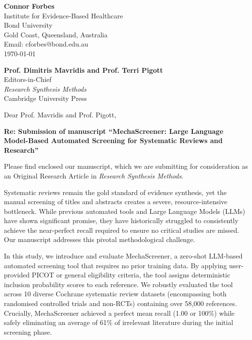 \documentclass[11pt,a4paper]{article}
\begin{document}
\begin{flushright}
\textbf{Connor Forbes}\\
Institute for Evidence-Based Healthcare\\
Bond University\\
Gold Coast, Queensland, Australia\\
Email: cforbes@bond.edu.au\\
\today
\end{flushright}

\vspace{2em}

\begin{flushleft}
\textbf{Prof. Dimitris Mavridis and Prof. Terri Pigott}\\
Editors-in-Chief\\
\textit{Research Synthesis Methods}\\
Cambridge University Press
\end{flushleft}

\vspace{2em}

Dear Prof. Mavridis and Prof. Pigott,

\vspace{1em}

\textbf{Re: Submission of manuscript ``MechaScreener: Large Language Model-Based Automated Screening for Systematic Reviews and Research''}

\vspace{1em}

Please find enclosed our manuscript, which we are submitting for consideration as an Original Research Article in \textit{Research Synthesis Methods}.

Systematic reviews remain the gold standard of evidence synthesis, yet the manual screening of titles and abstracts creates a severe, resource-intensive bottleneck. While previous automated tools and Large Language Models (LLMs) have shown significant promise, they have historically struggled to consistently achieve the near-perfect recall required to ensure no critical studies are missed. Our manuscript addresses this pivotal methodological challenge.

In this study, we introduce and evaluate MechaScreener, a zero-shot LLM-based automated screening tool that requires no prior training data. By applying user-provided PICOT or general eligibility criteria, the tool assigns deterministic inclusion probability scores to each reference. We robustly evaluated the tool across 10 diverse Cochrane systematic review datasets (encompassing both randomised controlled trials and non-RCTs) containing over 58,000 references. Crucially, MechaScreener achieved a perfect mean recall (1.00 or 100\%) while safely eliminating an average of 61\% of irrelevant literature during the initial screening phase.
\end{document}
